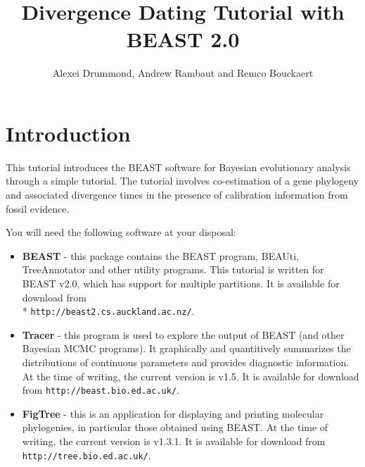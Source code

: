 \documentclass[11pt]{article}
\title{Divergence Dating Tutorial with BEAST 2.0}
\author{Alexei Drummond, Andrew Rambaut and Remco Bouckaert}
\newcommand{\BEASTVersion}{2.0}
\newcommand{\TracerVersion}{1.5}
\newcommand{\FigTreeVersion}{1.3.1}
\theoremstyle{plain}%
\theoremstyle{definition}
\theoremstyle{remark}
\begin{document}
\maketitle

\newcommand{\chainLength}{{1,000,000}}
\newcommand{\logEvery}{{200}}
\newcommand{\screenEvery}{{1000}}
\newcommand{\mccTree}{{\texttt{Primates.MCC.tree}}}

\section{Introduction}

This tutorial introduces the BEAST software for Bayesian evolutionary analysis through a simple tutorial. The tutorial involves co-estimation of a gene phylogeny and associated divergence times in the presence of calibration information from fossil evidence. 

You will need the following software at your disposal:

\begin{itemize}

\item {\bf BEAST} - this package contains the BEAST program, BEAUti, TreeAnnotator and other utility programs. This tutorial is written for BEAST v{\BEASTVersion}, which has support for multiple partitions. It is available for download from \\* \texttt{http://beast2.cs.auckland.ac.nz/}.
\item {\bf Tracer} - this program is used to explore the output of BEAST (and other Bayesian MCMC programs). It graphically and
quantitively summarizes the distributions of continuous parameters and provides diagnostic information. At the time of
writing, the current version is v{\TracerVersion}. It is available for download from \texttt{http://beast.bio.ed.ac.uk/}.
\item {\bf FigTree} - this is an application for displaying and printing molecular phylogenies, in particular those obtained using
BEAST. At the time of writing, the current version is v{\FigTreeVersion}. It is available for download from \texttt{http://tree.bio.ed.ac.uk/}.
\end{itemize}


\end{document}
